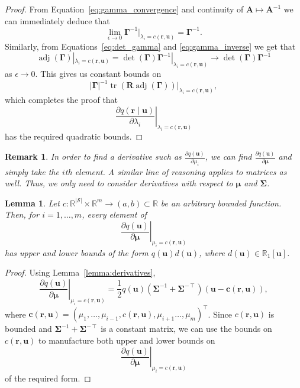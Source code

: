 \documentclass{mpaper}
\newtheorem{lemma}[theorem]{Lemma}
\newtheorem{remark}[theorem]{Remark}
\DeclareMathOperator{\adj}{adj}
\DeclareMathOperator{\tr}{tr}
\begin{document}
\begin{proof}
  From Equation~\eqref{eq:gamma_convergence} and continuity of $\mathbf{A} \mapsto
  \mathbf{A}^{-1}$ we can immediately deduce that
  \begin{equation} \label{eq:gamma_inverse}
    \lim_{\epsilon \to 0} \bm\Gamma^{-1}|_{\lambda_i = c(\mathbf{r},
      \mathbf{u})} = \bm\Gamma^{-1}.
  \end{equation}
  Similarly, from Equations~\eqref{eq:det_gamma} and \eqref{eq:gamma_inverse} we
  get that
  \[
    \adj(\bm\Gamma)|_{\lambda_i = c(\mathbf{r}, \mathbf{u})} =
    \det(\bm\Gamma)\bm\Gamma^{-1}|_{\lambda_i = c(\mathbf{r}, \mathbf{u})} \to
    \det(\bm\Gamma)\bm\Gamma^{-1}
  \]
  as $\epsilon \to 0$. This gives us constant bounds on
  \[
    |\bm\Gamma|^{-1}\tr(\mathbf{R}\adj(\bm\Gamma))|_{\lambda_i = c(\mathbf{r},
      \mathbf{u})},
  \]
  which completes the proof that
  \[
    \left. \frac{\partial q(\mathbf{r} \mid \mathbf{u})}{\partial \lambda_i}
    \right|_{\lambda_i = c(\mathbf{r}, \mathbf{u})}
  \]
  has the required quadratic bounds.
\end{proof}

\begin{remark}
  In order to find a derivative such as $\frac{\partial q(\mathbf{u})}{\partial
    \mu_i}$, we can find $\frac{\partial q(\mathbf{u})}{\partial \bm\mu}$ and
  simply take the $i$th element. A similar line of reasoning applies to matrices
  as well. Thus, we only need to consider derivatives with respect to $\bm\mu$
  and $\bm\Sigma$.
\end{remark}

\begin{lemma} \label{lemma:bound2}
  Let $c : \mathbb{R}^{|\mathcal{S}|} \times \mathbb{R}^m \to (a, b) \subset
  \mathbb{R}$ be an arbitrary bounded function. Then, for $i = 1, \dots, m$,
  every element of
  \[
    \left. \frac{\partial q(\mathbf{u})}{\partial \bm\mu} \right|_{\mu_i =
      c(\mathbf{r}, \mathbf{u})}
  \]
  has upper and lower bounds of the form $q(\mathbf{u})d(\mathbf{u})$,
  where $d(\mathbf{u}) \in \mathbb{R}_1[\mathbf{u}]$.
\end{lemma}
\begin{proof}
  Using Lemma~\ref{lemma:derivatives},
  \[
    \left. \frac{\partial q(\mathbf{u})}{\partial \bm\mu} \right|_{\mu_i =
      c(\mathbf{r}, \mathbf{u})} = \frac{1}{2}q(\mathbf{u})(\bm\Sigma^{-1} +
    \bm\Sigma^{-\intercal})(\mathbf{u} - \mathbf{c}(\mathbf{r}, \mathbf{u})),
  \]
  where $\mathbf{c}(\mathbf{r}, \mathbf{u}) = (\mu_1, \dots, \mu_{i - 1},
  c(\mathbf{r}, \mathbf{u}), \mu_{i + 1} \dots, \mu_m)^\intercal$. Since
  $c(\mathbf{r}, \mathbf{u})$ is bounded and $\bm\Sigma^{-1} +
  \bm\Sigma^{-\intercal}$ is a constant matrix, we can use the bounds on
  $c(\mathbf{r}, \mathbf{u})$ to manufacture both upper and lower bounds on
  \[
     \left. \frac{\partial q(\mathbf{u})}{\partial \bm\mu} \right|_{\mu_i =
      c(\mathbf{r}, \mathbf{u})}
  \]
  of the required form.
\end{proof}
\end{document}
